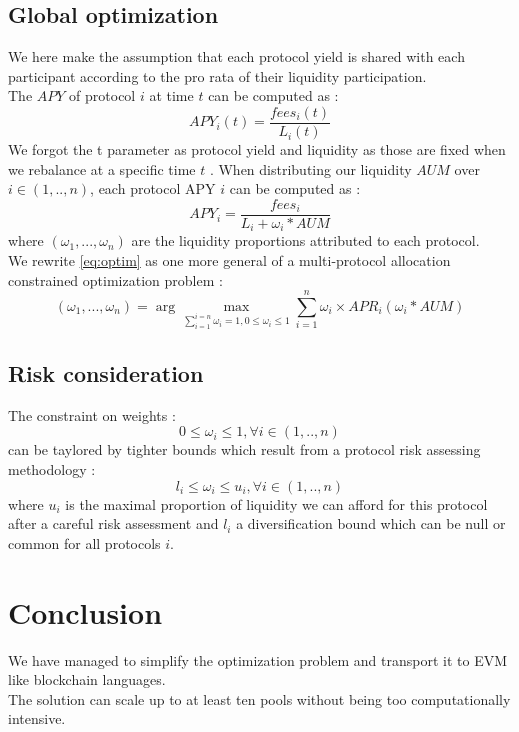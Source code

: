 \documentclass[conference]{IEEEtran}
\begin{document}
\subsection{Global optimization}
We here make the assumption that each protocol yield is shared with each participant according to the pro rata of their liquidity participation.\\
The $APY$ of protocol $i$ at time $t$ can be computed as :\\
\begin{equation}
APY_{i}(t) = \frac{fees_i(t)}{L_i(t)}
\end{equation}
We forgot the t parameter as protocol yield and liquidity as those are fixed when we rebalance at a specific time $t$ . When distributing our liquidity $AUM$ over
$i \in \left(1,..,n\right)$, each protocol APY $i$ can be computed as :
\begin{equation}
APY_{i} = \frac{fees_i}{L_i + \omega_i * AUM}
\end{equation}
where $\left( \omega_1,...,\omega_n \right)$ are the liquidity proportions attributed to each protocol.\\
We rewrite \ref{eq:optim} as one more general of a multi-protocol allocation constrained optimization problem :
\begin{equation}\label{multiprotocolallocation}
 \left( \omega_1,...,\omega_n \right)   =  \arg \max_{ \sum_{i = 1}^{i = n} \omega_i = 1,0\le \omega_i \le 1} { \sum_{i = 1}^{n} \omega_i \times APR_i\left(\omega_i * AUM \right) }
\end{equation}
\subsection{Risk consideration}
The constraint on weights :
\begin{equation}
0\le \omega_i \le 1, \forall i \in \left(1,..,n\right)
\end{equation}
can be taylored by tighter bounds which result from a protocol risk assessing methodology :
\begin{equation}\label{gogogo}
l_i \le \omega_i \le u_i, \forall i \in \left(1,..,n\right)
\end{equation}
where $u_i$ is the maximal proportion of liquidity we can afford for this protocol after a careful risk assessment and $l_i$ a diversification bound which can be null or common for all protocols $i$.
\section{Conclusion}
We have managed to simplify the optimization problem and transport it to EVM like blockchain languages.\\
The solution can scale up to at least ten pools without being too computationally intensive.\\


\nocite{*}
\end{document}
